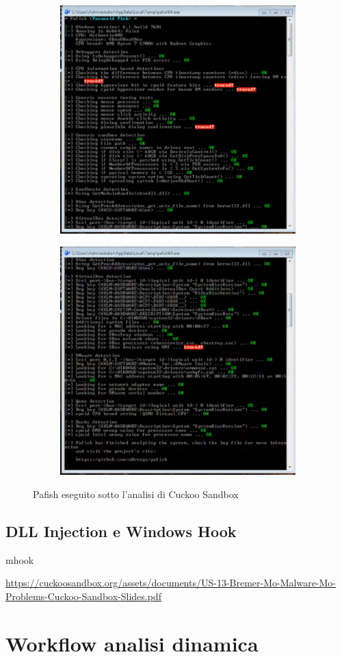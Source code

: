 \begin{figure}[H]
\centering
\begin{subfigure}{.5\textwidth}
  \centering
  \includegraphics[width=.9\linewidth]{assets/pafish_cuckoo_1.png}
\end{subfigure}%
\begin{subfigure}{.5\textwidth}
  \centering
  \includegraphics[width=.9\linewidth]{assets/pafish_cuckoo_2.png}
\end{subfigure}
\caption{Pafish eseguito sotto l'analisi di Cuckoo Sandbox}
\label{fig:pafish_cuckoo}
\end{figure}

\subsection{DLL Injection e Windows Hook}
mhook

\url{https://cuckoosandbox.org/assets/documents/US-13-Bremer-Mo-Malware-Mo-Problems-Cuckoo-Sandbox-Slides.pdf}

\section{Workflow analisi dinamica}
